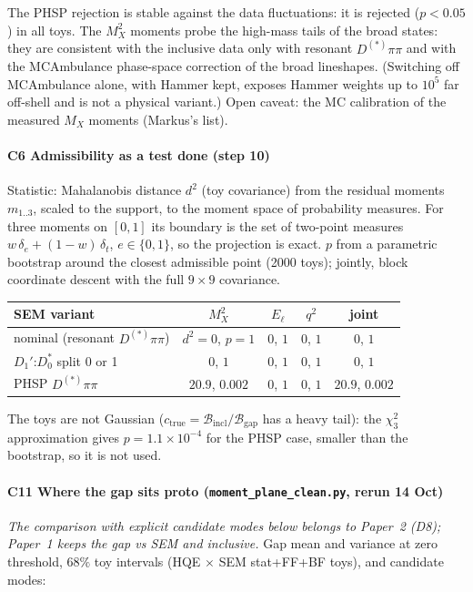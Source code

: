\documentclass[11pt]{article}
\newcommand{\done}{\textcolor{done}{\textbf{done}}}
\newcommand{\proto}{\textcolor{proto}{\textbf{proto}}}
\begin{document}
The PHSP rejection is stable against the data fluctuations: it is rejected ($p<0.05$) in all toys.
The $M_X^2$ moments probe the high-mass tails of the broad states: they are consistent with the inclusive data only with
resonant $D^{(*)}\pi\pi$ and with the MCAmbulance phase-space correction of the broad lineshapes. (Switching off
MCAmbulance alone, with Hammer kept, exposes Hammer weights up to $10^5$ far off-shell and is not a physical variant.)
Open caveat: the MC calibration of the measured $M_X$ moments (Markus's list).

\paragraph{C6 \quad Admissibility as a test \hfill \done{} (step 10)}
Statistic: Mahalanobis distance $d^2$ (toy covariance) from the residual moments $m_{1..3}$, scaled to the support, to the
moment space of probability measures. For three moments on $[0,1]$ its boundary is the set of two-point measures
$w\,\delta_e + (1-w)\,\delta_t$, $e\in\{0,1\}$, so the projection is exact. $p$ from a parametric bootstrap around the
closest admissible point (2000 toys); jointly, block coordinate descent with the full $9\times9$ covariance.

\begin{center}\small
\begin{tabular}{lcccc}
\toprule
SEM variant & $M_X^2$ & $E_\ell$ & $q^2$ & joint \\
\midrule
nominal (resonant $D^{(*)}\pi\pi$) & $d^2=0$, $p=1$ & $0$, $1$ & $0$, $1$ & $0$, $1$ \\
$D_1'$:$D_0^*$ split 0 or 1 & $0$, $1$ & $0$, $1$ & $0$, $1$ & $0$, $1$ \\
PHSP $D^{(*)}\pi\pi$ & $\mathbf{20.9}$, $\mathbf{0.002}$ & $0$, $1$ & $0$, $1$ & $20.9$, $0.002$ \\
\bottomrule
\end{tabular}
\end{center}
The toys are not Gaussian ($c_\text{true} = \mathcal{B}_\text{incl}/\mathcal{B}_\text{gap}$ has a heavy tail): the
$\chi^2_3$ approximation gives $p = 1.1\times10^{-4}$ for the PHSP case, smaller than the bootstrap, so it is not used.

\paragraph{C11 \quad Where the gap sits \hfill \proto{} (\texttt{moment\_plane\_clean.py}, rerun 14 Oct)}
\emph{The comparison with explicit candidate modes below belongs to Paper~2 (D8); Paper~1 keeps the gap vs SEM and inclusive.}
Gap mean and variance at zero threshold, $68\%$ toy intervals (HQE $\times$ SEM stat+FF+BF toys), and candidate modes:
\end{document}
